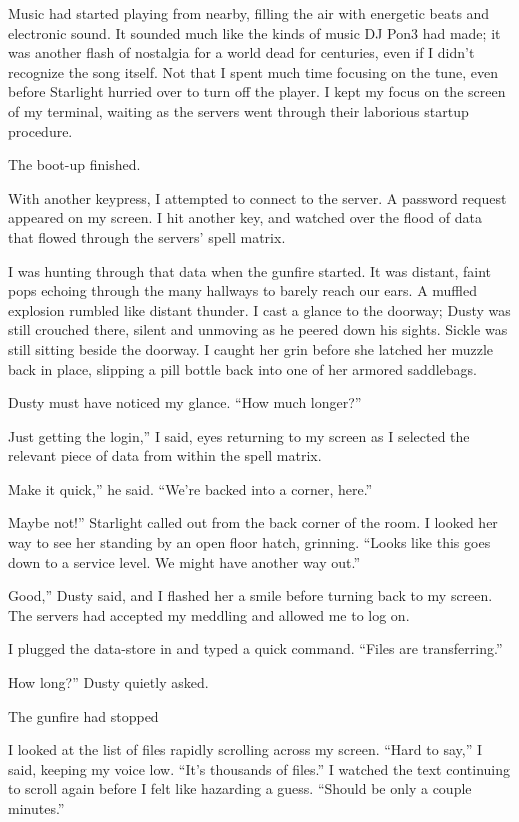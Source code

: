 Music had started playing from nearby, filling the air with energetic beats and electronic sound. It sounded much like the kinds of music DJ Pon3 had made; it was another flash of nostalgia for a world dead for centuries, even if I didn’t recognize the song itself. Not that I spent much time focusing on the tune, even before Starlight hurried over to turn off the player. I kept my focus on the screen of my terminal, waiting as the servers went through their laborious startup procedure.

The boot-up finished.

With another keypress, I attempted to connect to the server. A password request appeared on my screen. I hit another key, and watched over the flood of data that flowed through the servers’ spell matrix.

I was hunting through that data when the gunfire started. It was distant, faint pops echoing through the many hallways to barely reach our ears. A muffled explosion rumbled like distant thunder. I cast a glance to the doorway; Dusty was still crouched there, silent and unmoving as he peered down his sights. Sickle was still sitting beside the doorway. I caught her grin before she latched her muzzle back in place, slipping a pill bottle back into one of her armored saddlebags.

Dusty must have noticed my glance. “How much longer?”

\leavevmode{}Just getting the login,” I said, eyes returning to my screen as I selected the relevant piece of data from within the spell matrix.

\leavevmode{}Make it quick,” he said. “We’re backed into a corner, here.”

\leavevmode{}Maybe not!” Starlight called out from the back corner of the room. I looked her way to see her standing by an open floor hatch, grinning. “Looks like this goes down to a service level. We might have another way out.”

\leavevmode{}Good,” Dusty said, and I flashed her a smile before turning back to my screen. The servers had accepted my meddling and allowed me to log on.

I plugged the data-store in and typed a quick command. “Files are transferring.”

\leavevmode{}How long?” Dusty quietly asked.

The gunfire had stopped

I looked at the list of files rapidly scrolling across my screen. “Hard to say,” I said, keeping my voice low. “It’s thousands of files.” I watched the text continuing to scroll again before I felt like hazarding a guess. “Should be only a couple minutes.”

